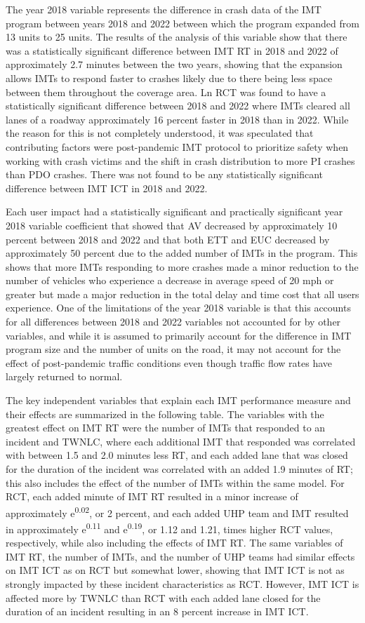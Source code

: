 \documentclass[
  letterpaper,
  authoryear]{elsarticle}
\begin{document}
The year 2018 variable represents the difference in crash data of the
IMT program between years 2018 and 2022 between which the program
expanded from 13 units to 25 units. The results of the analysis of this
variable show that there was a statistically significant difference
between IMT RT in 2018 and 2022 of approximately 2.7 minutes between the
two years, showing that the expansion allows IMTs to respond faster to
crashes likely due to there being less space between them throughout the
coverage area. Ln RCT was found to have a statistically significant
difference between 2018 and 2022 where IMTs cleared all lanes of a
roadway approximately 16 percent faster in 2018 than in 2022. While the
reason for this is not completely understood, it was speculated that
contributing factors were post-pandemic IMT protocol to prioritize
safety when working with crash victims and the shift in crash
distribution to more PI crashes than PDO crashes. There was not found to
be any statistically significant difference between IMT ICT in 2018 and
2022.

Each user impact had a statistically significant and practically
significant year 2018 variable coefficient that showed that AV decreased
by approximately 10 percent between 2018 and 2022 and that both ETT and
EUC decreased by approximately 50 percent due to the added number of
IMTs in the program. This shows that more IMTs responding to more
crashes made a minor reduction to the number of vehicles who experience
a decrease in average speed of 20 mph or greater but made a major
reduction in the total delay and time cost that all users experience.
One of the limitations of the year 2018 variable is that this accounts
for all differences between 2018 and 2022 variables not accounted for by
other variables, and while it is assumed to primarily account for the
difference in IMT program size and the number of units on the road, it
may not account for the effect of post-pandemic traffic conditions even
though traffic flow rates have largely returned to normal.

The key independent variables that explain each IMT performance measure
and their effects are summarized in the following table. The variables
with the greatest effect on IMT RT were the number of IMTs that
responded to an incident and TWNLC, where each additional IMT that
responded was correlated with between 1.5 and 2.0 minutes less RT, and
each added lane that was closed for the duration of the incident was
correlated with an added 1.9 minutes of RT; this also includes the
effect of the number of IMTs within the same model. For RCT, each added
minute of IMT RT resulted in a minor increase of approximately
e\textsuperscript{0.02}, or 2 percent, and each added UHP team and IMT
resulted in approximately e\textsuperscript{0.11} and
e\textsuperscript{0.19}, or 1.12 and 1.21, times higher RCT values,
respectively, while also including the effects of IMT RT. The same
variables of IMT RT, the number of IMTs, and the number of UHP teams had
similar effects on IMT ICT as on RCT but somewhat lower, showing that
IMT ICT is not as strongly impacted by these incident characteristics as
RCT. However, IMT ICT is affected more by TWNLC than RCT with each added
lane closed for the duration of an incident resulting in an 8 percent
increase in IMT ICT.
\end{document}
